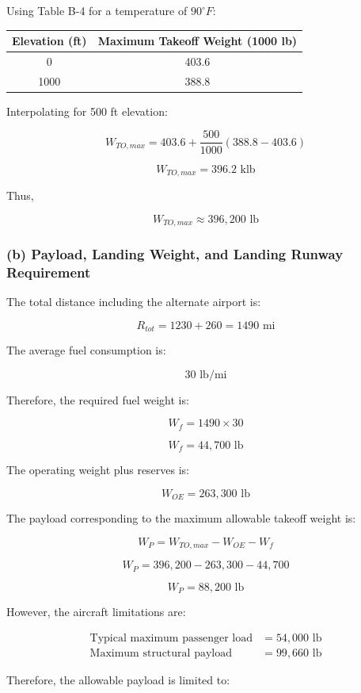 \documentclass{KPS_assignment}
\begin{document}
Using Table B-4 for a temperature of $90^\circ F$:

\begin{center}
\begin{tabular}{c|c}
Elevation (ft) & Maximum Takeoff Weight (1000 lb) \\
\hline
0 & 403.6 \\
1000 & 388.8
\end{tabular}
\end{center}

Interpolating for 500 ft elevation:

\[
W_{TO,max}
=
403.6
+
\frac{500}{1000}(388.8-403.6)
\]

\[
W_{TO,max}=396.2 \text{ klb}
\]

Thus,

\[
\boxed{
W_{TO,max}\approx396,200 \text{ lb}
}
\]

\subsubsection*{(b) Payload, Landing Weight, and Landing Runway Requirement}

The total distance including the alternate airport is:

\[
R_{tot}=1230+260=1490 \text{ mi}
\]

The average fuel consumption is:

\[
30 \text{ lb/mi}
\]

Therefore, the required fuel weight is:

\[
W_f=1490\times30
\]

\[
W_f=44,700 \text{ lb}
\]

The operating weight plus reserves is:

\[
W_{OE}=263,300 \text{ lb}
\]

The payload corresponding to the maximum allowable takeoff weight is:

\[
W_P
=
W_{TO,max}-W_{OE}-W_f
\]

\[
W_P
=
396,200-263,300-44,700
\]

\[
W_P=88,200 \text{ lb}
\]

However, the aircraft limitations are:

\begin{align*}
\text{Typical maximum passenger load} &= 54,000 \text{ lb} \\
\text{Maximum structural payload} &= 99,660 \text{ lb}
\end{align*}

Therefore, the allowable payload is limited to:
\end{document}
